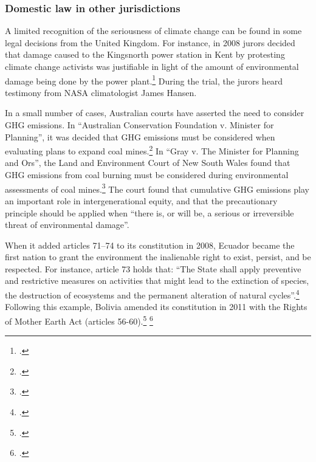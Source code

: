 \documentclass[10pt]{article}
\begin{document}
		\subsubsection{Domestic law in other jurisdictions}
		\label{sec:IntlDomesticLaw}
		
		
		
A limited recognition of the seriousness of climate change can be found in some legal decisions from the United Kingdom.
For instance, in 2008 jurors decided that damage caused to the Kingsnorth power station in Kent by protesting climate change activists was justifiable in light of the amount of environmental damage being done by the power plant.\footcite[][]{JuryDecides}
During the trial, the jurors heard testimony from NASA climatologist James Hansen.



In a small number of cases, Australian courts have asserted the need to consider GHG emissions.
In ``Australian Conservation Foundation v. Minister for Planning'', it was decided that GHG emissions must be considered when evaluating plans to expand coal mines.\footcite[][]{ACFvPlanning}
In ``Gray v. The Minister for Planning and Ors'', the Land and Environment Court of New South Wales found that GHG emissions from coal burning must be considered during environmental assessments of coal mines.\footcite[][]{GrayvPlanning}
The court found that cumulative GHG emissions play an important role in intergenerational equity, and that the precautionary principle should be applied when ``there is, or will be, a serious or irreversible threat of environmental damage''.



When it added articles 71--74 to its constitution in 2008, Ecuador became the first nation to grant the environment the inalienable right to exist, persist, and be respected.
For instance, article 73 holds that: ``The State shall apply preventive and restrictive measures on activities that might lead to the extinction of species, the destruction of ecosystems and the permanent alteration of natural cycles''.\footcite[][]{EcuadorConstitution}
Following this example, Bolivia amended its constitution in 2011 with the Rights of Mother Earth Act (articles 56-60).\footcite[][p. 28--29]{BoliviaConstitution} \footcite[][]{BoliviaGives}
\end{document}
